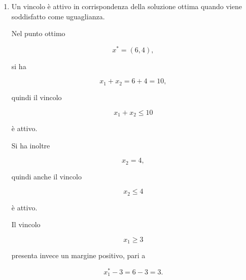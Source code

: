 \begin{enumerate}
\[
z(A)=2\cdot3+3\cdot0=6.
\]

Nel vertice \(B\),

\[
z(B)=2\cdot10+3\cdot0=20.
\]

Nel vertice \(C\),

\[
z(C)=2\cdot6+3\cdot4=12+12=24.
\]

Nel vertice \(D\),

\[
z(D)=2\cdot3+3\cdot4=6+12=18.
\]

Raccogliendo i risultati:

\[
\begin{array}{c|cccc}
\text{Vertice}
&
A
&
B
&
C
&
D
\\
\hline
z
&
6
&
20
&
24
&
18
\end{array}
\]

Il valore massimo \`e quindi

\[
z^*=24,
\]

ottenuto nel punto

\[
x^*=(6,4).
\]

Dal punto di vista geometrico, le rette di livello della funzione obiettivo
sono date da

\[
2x_1+3x_2=k.
\]

Al crescere di \(k\), tali rette si spostano parallelamente nella direzione
di crescita della funzione obiettivo; l'ultimo punto di contatto con la
regione ammissibile \`e proprio il vertice \(C\).

\item Un vincolo \`e attivo in corrispondenza della soluzione ottima quando
viene soddisfatto come uguaglianza.

Nel punto ottimo

\[
x^*=(6,4),
\]

si ha

\[
x_1+x_2=6+4=10,
\]

quindi il vincolo

\[
x_1+x_2\leq10
\]

\`e attivo.

Si ha inoltre

\[
x_2=4,
\]

quindi anche il vincolo

\[
x_2\leq4
\]

\`e attivo.

Il vincolo

\[
x_1\geq3
\]

presenta invece un margine positivo, pari a

\[
x_1^*-3=6-3=3.
\]


\end{enumerate}

